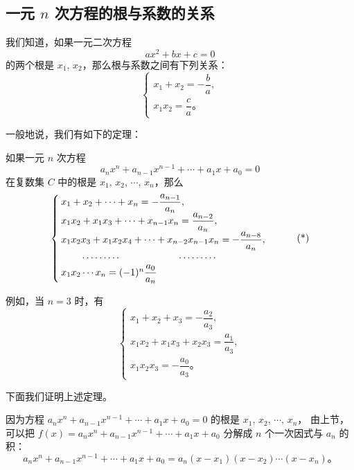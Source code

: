 \subsection{一元 $n$ 次方程的根与系数的关系}\label{subsec:1-7}

我们知道，如果一元二次方程
$$ ax^2 + bx + c = 0 $$
的两个根是 $x_1,\, x_2$，那么根与系数之间有下列关系：
$$
\begin{cases}
    x_1 + x_2 = -\dfrac{b}{a}, \\[1em]
    x_1 x_2 = \dfrac{c}{a} \text{。}
\end{cases}
$$

一般地说，我们有如下的定理：

\begin{theorem}\footnotemark
    如果一元 $n$ 次方程
    $$ a_n x^n + a_{n-1}x^{n-1} + \cdots + a_1x + a_0 = 0 $$
    在复数集 $C$ 中的根是 $x_1,\, x_2,\, \cdots,\, x_n$，那么
    \begin{equation}
    \begin{cases}
        x_1 + x_2 + \cdots + x_n = -\dfrac{a_{n-1}}{a_n}, \\
        x_1 x_2 + x_1 x_3 + \cdots + x_{n-1} x_n = \dfrac{a_{n-2}}{a_n}, \\
        x_1 x_2 x_3 + x_1 x_2 x_4 + \cdots + x_{n-2} x_{n-1} x_n = -\dfrac{a_{n-8}}{a_n}, \\
        \rule{2em}{0pt} \cdots \cdots \cdots  \hspace{6em} \cdots \cdots \cdots \\
        x_1 x_2 \cdots x_n = (-1)^n \dfrac{a_0}{a_n}
    \end{cases} \tag{*} \label{eq:wddl}
    \end{equation}
\end{theorem}

例如，当 $n = 3$ 时，有
$$\begin{cases}
    x_1 + x_2 + x_3 = -\dfrac{a_2}{a_3}, \\
    x_1 x_2 + x_1 x_3 + x_2 x_3 = \dfrac{a_1}{a_3}, \\
    x_1 x_2 x_3 = -\dfrac{a_0}{a_3} \text{。}
\end{cases}$$

下面我们证明上述定理。

\zhengming 因为方程 $a_n x^n + a_{n-1}x^{n-1} + \cdots + a_1x + a_0 = 0$ 的根是 $x_1,\, x_2,\, \cdots,\, x_n$，
由上节，可以把 $f(x) = a_n x^n + a_{n-1}x^{n-1} + \cdots + a_1x + a_0$
分解成 $n$ 个一次因式与 $a_n$ 的积：
$$ a_n x^n + a_{n-1}x^{n-1} + \cdots + a_1x + a_0 = a_n (x - x_1) (x - x_2) \cdots (x - x_n) \text{。} $$

